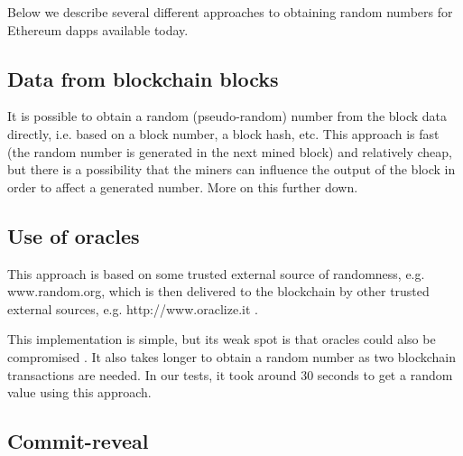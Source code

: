 \documentclass[12pt]{article}
\begin{document}
Below we describe several different approaches to obtaining random numbers for Ethereum dapps available today.\par

\vspace{\baselineskip}
\subsection{Data from blockchain blocks}
\label{Data from blockchain blocks}  \par

It is possible to obtain a random (pseudo-random) number from the block data directly, i.e. based on a block number, a block hash, etc. This approach is fast (the random number is generated in the next mined block) and relatively cheap, but there is a possibility that the miners can influence the output of the block in order to affect a generated number. More on this further down.\par


\vspace{\baselineskip}
\subsection{Use of oracles}
\label{Use of oracles}  \par

This approach is based on some trusted external source of randomness, e.g. www.random.org, which is then delivered to the blockchain by other trusted external sources, e.g. http://www.oraclize.it  \cite{Oraclize_2017_May_18}.\par

This implementation is simple, but its weak spot is that oracles could also be compromised  \cite{Dao_Casino_Ksenya_Serova_2017_Jun_27}. It also takes longer to obtain a random number as two blockchain transactions are needed. In our tests, it took around 30 seconds to get a random value using this approach.\par

\vspace{\baselineskip}
\subsection{Commit-reveal}
\label{Commit-reveal}  \par
\end{document}
